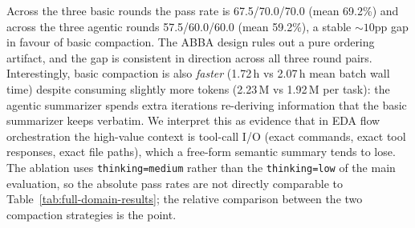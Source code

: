 Across the three basic rounds the pass rate is 67.5/70.0/70.0 (mean 69.2\%) and
across the three agentic rounds 57.5/60.0/60.0 (mean 59.2\%), a stable
${\sim}10$pp gap in favour of basic compaction. The ABBA design rules out a
pure ordering artifact, and the gap is consistent in direction across all three
round pairs. Interestingly, basic compaction is also \emph{faster} (1.72\,h vs
2.07\,h mean batch wall time) despite consuming slightly more tokens (2.23\,M vs
1.92\,M per task): the agentic summarizer spends extra iterations re-deriving
information that the basic summarizer keeps verbatim. We interpret this as
evidence that in EDA flow orchestration the high-value context is tool-call I/O
(exact commands, exact tool responses, exact file paths), which a free-form
semantic summary tends to lose. The ablation uses \texttt{thinking=medium}
rather than the \texttt{thinking=low} of the main evaluation, so the absolute
pass rates are not directly comparable to Table~\ref{tab:full-domain-results};
the relative comparison between the two compaction strategies is the point.
